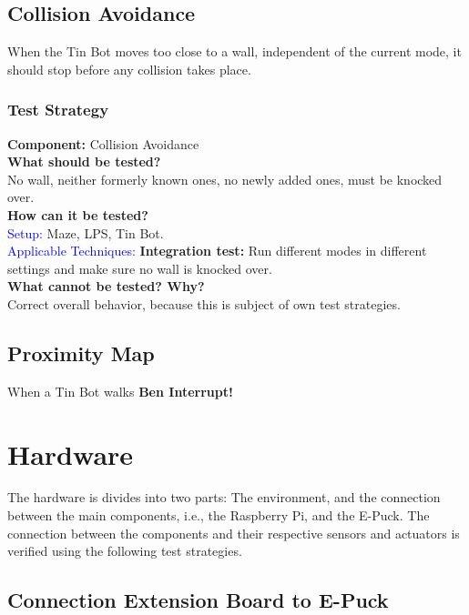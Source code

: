 \documentclass[a4paper,parskip,headheight=38pt]{scrartcl} %
\newcommand{\teststrat}[5]{
    \subsubsection{Test Strategy}
	\textbf{Component:} #1 \\
	\noindent\textbf{What should be tested?} \\
    \noindent #2 \\
	\noindent\textbf{How can it be tested?} \\
    \noindent\textcolor{blue}{Setup:} #3 \\
    \noindent\textcolor{blue}{Applicable Techniques:} #4 \\
	\noindent\textbf{What cannot be tested? Why?} \\
    \noindent #5
}
\newcommand{\ie}{i.e.}
\newcommand{\BLACK}{\textbf{Integration test: }}
\begin{document}
\subsection{Collision Avoidance}
When the Tin Bot moves too close to a wall, independent of the current mode, it
should stop before any collision takes place.
\teststrat{Collision Avoidance}{
    No wall, neither formerly known ones, no newly added ones, must be knocked
    over.
}{
    Maze, LPS, Tin Bot.
}{
    \BLACK Run different modes in different settings and make sure no
    wall is knocked over.
}{
    Correct overall behavior, because this is subject of own test strategies.
}

\subsection{Proximity Map}
When a Tin Bot walks \textbf{Ben Interrupt!}

\section{Hardware} 
The hardware is divides into two parts: The environment, and the connection
between the main components, \ie, the Raspberry Pi, and the E-Puck. 
The connection between the components and their respective sensors and actuators
is verified using the following test strategies.

\subsection{Connection Extension Board to E-Puck}
\end{document}
